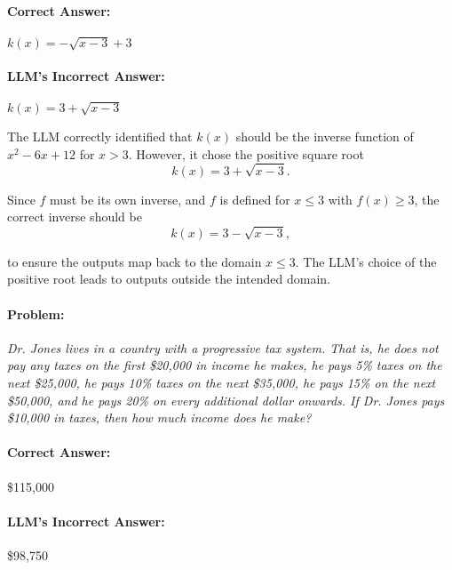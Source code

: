 \documentclass[11pt,a4paper]{article}
\begin{document}
\paragraph{Correct Answer:} \( k(x) = -\sqrt{x - 3} + 3 \)

\paragraph{LLM's Incorrect Answer:} \( k(x) = 3 + \sqrt{x - 3} \)

\begin{tcolorbox}[colback=gray!10, colframe=black, title=\textbf{Step-by-Step Analysis}, fonttitle=\bfseries]
\footnotesize
The LLM correctly identified that \( k(x) \) should be the inverse function of \( x^2 - 6x + 12 \) for \( x > 3 \). However, it chose the positive square root
\[
k(x) = 3 + \sqrt{x - 3}.
\]

Since \( f \) must be its own inverse, and \( f \) is defined for \( x \leq 3 \) with \( f(x) \geq 3 \), the correct inverse should be
\[
k(x) = 3 - \sqrt{x - 3},
\]

to ensure the outputs map back to the domain \( x \leq 3 \). The LLM's choice of the positive root leads to outputs outside the intended domain.
\end{tcolorbox}

\paragraph{Problem:} \textit{Dr. Jones lives in a country with a progressive tax system. That is, he does not pay any taxes on the first \$20,000 in income he makes, he pays 5\% taxes on the next \$25,000, he pays 10\% taxes on the next \$35,000, he pays 15\% on the next \$50,000, and he pays 20\% on every additional dollar onwards. If Dr. Jones pays \$10,000 in taxes, then how much income does he make?}

\paragraph{Correct Answer:} \$115,000

\paragraph{LLM's Incorrect Answer:} \$98,750
\end{document}
